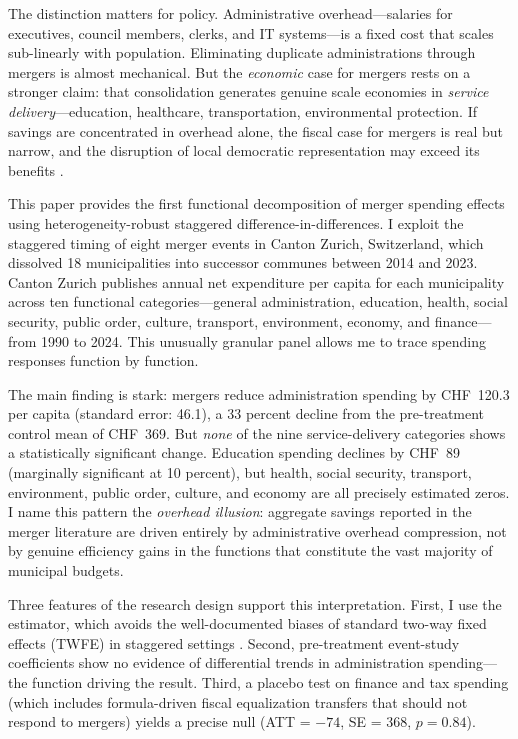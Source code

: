 \documentclass[12pt]{article}
\begin{document}
The distinction matters for policy. Administrative overhead---salaries for executives, council members, clerks, and IT systems---is a fixed cost that scales sub-linearly with population. Eliminating duplicate administrations through mergers is almost mechanical. But the \textit{economic} case for mergers rests on a stronger claim: that consolidation generates genuine scale economies in \textit{service delivery}---education, healthcare, transportation, environmental protection. If savings are concentrated in overhead alone, the fiscal case for mergers is real but narrow, and the disruption of local democratic representation may exceed its benefits \citep{lassen2006, koch2013}.

This paper provides the first functional decomposition of merger spending effects using heterogeneity-robust staggered difference-in-differences. I exploit the staggered timing of eight merger events in Canton Zurich, Switzerland, which dissolved 18 municipalities into successor communes between 2014 and 2023. Canton Zurich publishes annual net expenditure per capita for each municipality across ten functional categories---general administration, education, health, social security, public order, culture, transport, environment, economy, and finance---from 1990 to 2024. This unusually granular panel allows me to trace spending responses function by function.

The main finding is stark: mergers reduce administration spending by CHF~120.3 per capita (standard error: 46.1), a 33 percent decline from the pre-treatment control mean of CHF~369. But \textit{none} of the nine service-delivery categories shows a statistically significant change. Education spending declines by CHF~89 (marginally significant at 10 percent), but health, social security, transport, environment, public order, culture, and economy are all precisely estimated zeros. I name this pattern the \textit{overhead illusion}: aggregate savings reported in the merger literature are driven entirely by administrative overhead compression, not by genuine efficiency gains in the functions that constitute the vast majority of municipal budgets.

Three features of the research design support this interpretation. First, I use the \citet{callaway2021} estimator, which avoids the well-documented biases of standard two-way fixed effects (TWFE) in staggered settings \citep{goodman-bacon2021, sun2021}. Second, pre-treatment event-study coefficients show no evidence of differential trends in administration spending---the function driving the result. Third, a placebo test on finance and tax spending (which includes formula-driven fiscal equalization transfers that should not respond to mergers) yields a precise null (ATT = $-74$, SE = 368, $p = 0.84$).
\end{document}
